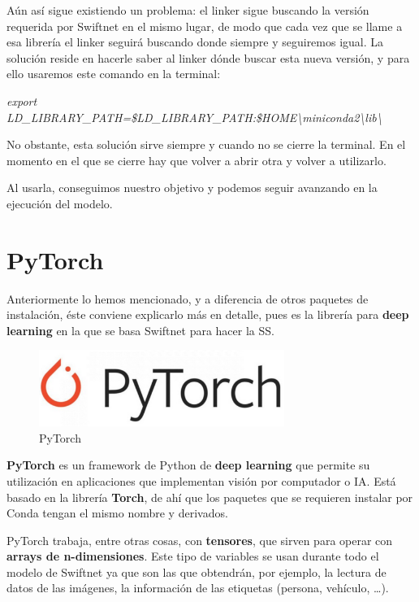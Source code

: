 Aún así sigue existiendo un problema: el linker sigue buscando la versión requerida por Swiftnet en el mismo lugar, de modo que cada vez que se llame a esa librería el linker seguirá buscando donde siempre y seguiremos igual. La solución reside en hacerle saber al linker dónde buscar esta nueva versión, y para ello usaremos este comando en la terminal:

\begin{center}
\textit{export LD\_LIBRARY\_PATH=\$LD\_LIBRARY\_PATH:\$HOME\textbackslash{miniconda2}\textbackslash{lib}\textbackslash{}}
\end{center}

No obstante, esta solución sirve siempre y cuando no se cierre la terminal. En el momento en el que se cierre hay que volver a abrir otra y volver a utilizarlo.

Al usarla, conseguimos nuestro objetivo y podemos seguir avanzando en la ejecución del modelo.

\section{PyTorch}

Anteriormente lo hemos mencionado, y a diferencia de otros paquetes de instalación, éste conviene explicarlo más en detalle, pues es la librería para \textbf{deep learning} en la que se basa Swiftnet para hacer la \ac{SS}.

\begin{figure}[H]
  \centering
  \includegraphics[width=8cm]{Figuras/PyTorch.eps}
  \caption{PyTorch}
\end{figure}

\textbf{PyTorch} \cite{pytorch} es un framework de Python de \textbf{deep learning} que permite su utilización en aplicaciones que implementan visión por computador o IA. Está basado en la librería \textbf{Torch}, de ahí que los paquetes que se requieren instalar por Conda tengan el mismo nombre y derivados.

PyTorch trabaja, entre otras cosas, con \textbf{tensores}, que sirven para operar con \textbf{arrays de n-dimensiones}. Este tipo de variables se usan durante todo el modelo de Swiftnet ya que son las que obtendrán, por ejemplo, la lectura de datos de las imágenes, la información de las etiquetas (persona, vehículo, \ldots).


